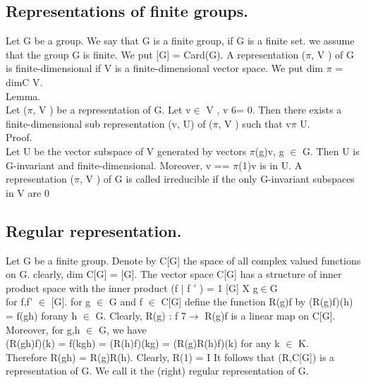 \documentclass[18pt,a4paper]{article}
\begin{document}
\subsection{ Representations of finite groups.}
 Let G be a group. We say that G is a finite group, if G is a finite set. we assume that the group G is finite. We put [G] = Card(G). 
    A representation ($\pi$, V ) of G is finite-dimensional if V is a finite-dimensional vector space. We put dim $\pi$ = dimC V.
\\ Lemma.  
\\Let ($\pi$, V ) be a representation of G. Let v$\in$ V , v 6= 0. Then there exists a finite-dimensional sub representation (v, U) of ($\pi$, V ) such that v$\pi$ U. 
\\   Proof.
\\ Let U be the vector subspace of V generated by vectors $\pi$(g)v, g $\in$ G. Then U is G-invariant and finite-dimensional.
 Moreover, v == $\pi$(1)v is in U.
 A representation ($\pi$, V ) of G is called irreducible if the only G-invariant subspaces in V are {0}  
\subsection{Regular representation.}
 Let G be a finite group. Denote by C[G] the space of all complex valued functions on G. clearly, dim C[G] = [G]. 
The vector space C[G] has a structure of inner product space with the inner product (f | f ' ) = 1 [G] X g$\in$G 
\\ for f,f' $\in$ [G]. for g $\in$ G and f $\in$ C[G] deﬁne the function R(g)f by (R(g)f)(h) = f(gh) forany h $\in$ G. Clearly, R(g) : f 7$\rightarrow$ R(g)f is a linear map on C[G]. Moreover, for g,h $\in$ G, we have 
\\(R(gh)f)(k) = f(kgh) = (R(h)f)(kg) = (R(g)R(h)f)(k) for any k $\in$ K.
\\ Therefore R(gh) = R(g)R(h). Clearly, R(1) = I
 It follows that (R,C[G]) is a representation of G. We call it the (right) regular representation of G.
\end{document}
